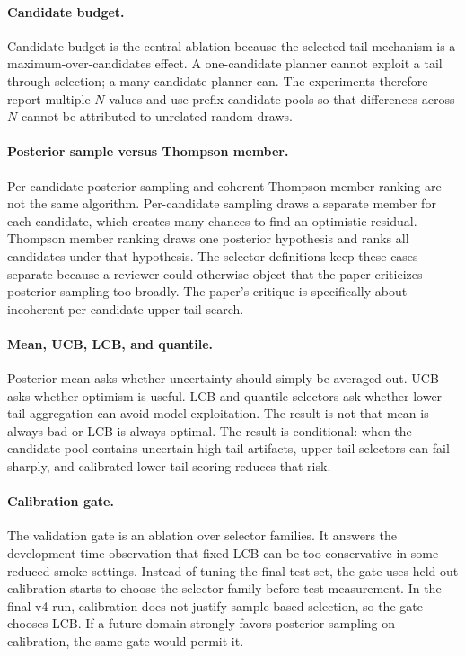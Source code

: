 \documentclass{article}
\begin{document}
\paragraph{Candidate budget.}
Candidate budget is the central ablation because the selected-tail mechanism is
a maximum-over-candidates effect. A one-candidate planner cannot exploit a
tail through selection; a many-candidate planner can. The experiments therefore
report multiple $N$ values and use prefix candidate pools so that differences
across $N$ cannot be attributed to unrelated random draws.

\paragraph{Posterior sample versus Thompson member.}
Per-candidate posterior sampling and coherent Thompson-member ranking are not
the same algorithm. Per-candidate sampling draws a separate member for each
candidate, which creates many chances to find an optimistic residual. Thompson
member ranking draws one posterior hypothesis and ranks all candidates under
that hypothesis. The selector definitions keep these cases separate because a
reviewer could otherwise object that the paper criticizes posterior sampling
too broadly. The paper's critique is specifically about incoherent
per-candidate upper-tail search.

\paragraph{Mean, UCB, LCB, and quantile.}
Posterior mean asks whether uncertainty should simply be averaged out. UCB
asks whether optimism is useful. LCB and quantile selectors ask whether
lower-tail aggregation can avoid model exploitation. The result is not that
mean is always bad or LCB is always optimal. The result is conditional: when
the candidate pool contains uncertain high-tail artifacts, upper-tail selectors
can fail sharply, and calibrated lower-tail scoring reduces that risk.

\paragraph{Calibration gate.}
The validation gate is an ablation over selector families. It answers the
development-time observation that fixed LCB can be too conservative in some
reduced smoke settings. Instead of tuning the final test set, the gate uses
held-out calibration starts to choose the selector family before test
measurement. In the final v4 run, calibration does not justify sample-based
selection, so the gate chooses LCB. If a future domain strongly favors
posterior sampling on calibration, the same gate would permit it.
\end{document}
